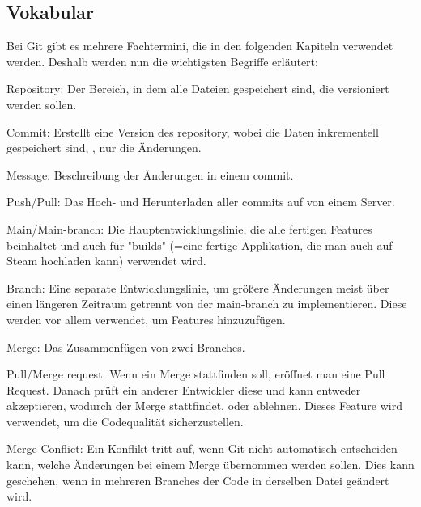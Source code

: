 \renewcommand{\kapitelautor}{Autor: Felix Zwickelstorfer}
\subsection{Vokabular}\label{subsec:git-vokabular}


\renewcommand{\kapitelautor}{Autor: Felix Zwickelstorfer}

Bei Git gibt es mehrere Fachtermini, die in den folgenden Kapiteln verwendet werden.
Deshalb werden nun die wichtigsten Begriffe erläutert:

\begin{liste}
    \item Repository: Der Bereich, in dem alle Dateien gespeichert sind, die versioniert werden sollen.
    \item Commit: Erstellt eine Version des repository, wobei die Daten inkrementell gespeichert sind, \dah, nur die Änderungen.
    \item Message: Beschreibung der Änderungen in einem commit.
    \item Push/Pull: Das Hoch- und Herunterladen aller commits auf \bzw von einem Server.
    \item Main/Main-branch: Die Hauptentwicklungslinie, die alle fertigen Features beinhaltet und auch für "builds" (=eine fertige Applikation, die man auch auf Steam hochladen kann) verwendet wird.
    \item Branch: Eine separate Entwicklungslinie, um größere Änderungen meist über einen längeren Zeitraum getrennt von der main-branch zu implementieren.
    Diese werden vor allem verwendet, um Features hinzuzufügen.
    \item Merge: Das Zusammenfügen von zwei Branches.
    \item Pull/Merge request: Wenn ein Merge stattfinden soll, eröffnet man eine Pull Request.
    Danach prüft ein anderer Entwickler diese und kann entweder akzeptieren, wodurch der Merge stattfindet, oder ablehnen.
    Dieses Feature wird verwendet, um die Codequalität sicherzustellen.
    \item Merge Conflict: Ein Konflikt tritt auf, wenn Git nicht automatisch entscheiden kann, welche Änderungen bei einem Merge übernommen werden sollen.
    Dies kann geschehen, wenn in mehreren Branches der Code in derselben Datei geändert wird.
\end{liste}
